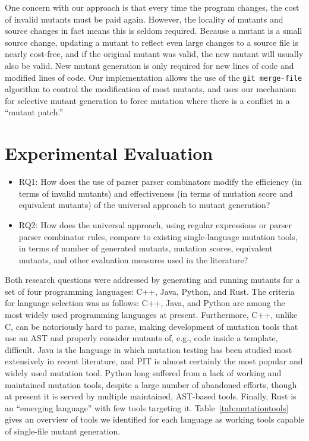 \documentclass[acmsmall]{acmart}
\begin{document}
{One concern with our approach is that every time the
program changes, the cost of invalid mutants must be paid again.
However, the locality of mutants and source changes in fact means this
is seldom required.   Because a mutant is a small source change, updating a mutant to
reflect even large changes to a source file is nearly cost-free, and if the
original mutant was valid, the new mutant will usually also be valid.
New mutant generation is only required for new lines of code and
modified lines of code.  Our
implementation allows the use of the {\tt git merge-file} algorithm to control the
modification of most mutants, and uses our mechanism for
selective mutant generation to force mutation where
there is a conflict in a ``mutant patch.''


\section{Experimental Evaluation}

\begin{itemize}

  \item{RQ1:}  How does the use of parser parser combinators modify 
    the efficiency (in terms of invalid mutants) and effectiveness (in
    terms of mutation score and equivalent mutants) of the universal
    approach to mutant generation?

\item{RQ2:}  How does the universal approach, using regular expressions
  or parser parser combinator rules, compare to existing
  single-language mutation tools, in terms of number of generated
  mutants, mutation scores, equivalent mutants, and other evaluation measures used in the literature?

\end{itemize}


Both research questions were addressed by generating and running
mutants for a set of four programming languages: C++, Java, Python,
and Rust.  The criteria for language selection was as follows: C++,
Java, and Python are among the most widely used programming languages
at present.  Furthermore, C++, unlike C, can be notoriously hard to
parse, making development of mutation tools that use an AST and
properly consider mutants of, e.g., code inside a template,
difficult.  Java is the language in which mutation testing has been
studied most extensively in recent literature, and PIT is almost
certainly the most popular and widely used mutation tool.  Python long
suffered from a lack of working and maintained mutation tools, despite
a large number of abandoned efforts, though at present it is served by
multiple maintained, AST-based tools.  Finally, Rust is an ``emerging
language'' with few tools targeting it.  Table~\ref{tab:mutationtools}
gives an overview of tools we identified for each language as working tools
capable of single-file mutant generation.

}
\end{document}
